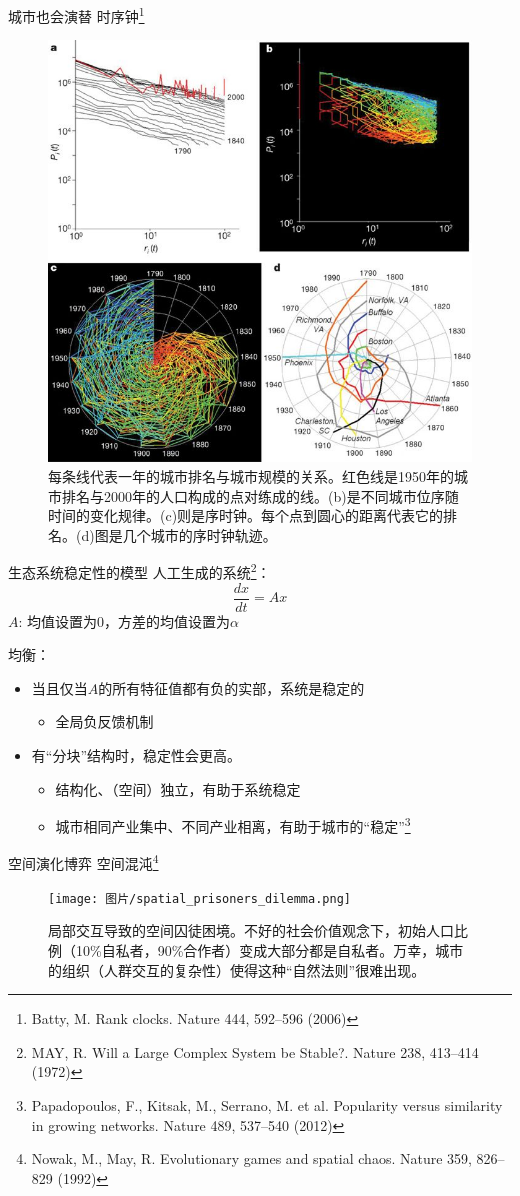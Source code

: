 \documentclass[utf8]{ctexbeamer}
\begin{document}
\begin{frame}{城市也会演替}
    时序钟\footnote{Batty, M. Rank clocks. Nature 444, 592–596 (2006)}
    \begin{figure}
        \centering
        \includegraphics[width = 0.4\linewidth]{图片/rankclocks.jpg}
        \caption{每条线代表一年的城市排名与城市规模的关系。红色线是1950年的城市排名与2000年的人口构成的点对练成的线。(b)是不同城市位序随时间的变化规律。(c)则是序时钟。每个点到圆心的距离代表它的排名。(d)图是几个城市的序时钟轨迹。}
    \end{figure}
\end{frame}

\begin{frame}{生态系统稳定性的模型}
    人工生成的系统\footnote{MAY, R. Will a Large Complex System be Stable?. Nature 238, 413–414 (1972)}：\[\frac{dx}{dt} = Ax\]
    $A$: 均值设置为\(0\)，方差的均值设置为\(\alpha\)

    均衡：
    \begin{itemize}
        \item 当且仅当\(A\)的所有特征值都有负的实部，系统是稳定的
        \begin{itemize}
            \item 全局负反馈机制
        \end{itemize}
        \item 有“分块”结构时，稳定性会更高。
        \begin{itemize}
            \item 结构化、（空间）独立，有助于系统稳定
            \item 城市相同产业集中、不同产业相离，有助于城市的“稳定”\footnote{Papadopoulos, F., Kitsak, M., Serrano, M. et al. Popularity versus similarity in growing networks. Nature 489, 537–540 (2012)}
        \end{itemize}
    \end{itemize}
\end{frame}

\begin{frame}{空间演化博弈}
    空间混沌\footnote{Nowak, M., May, R. Evolutionary games and spatial chaos. Nature 359, 826–829 (1992)}
    \begin{figure}
        \centering
        \texttt{[image: 图片/spatial\_prisoners\_dilemma.png]}
        \caption{局部交互导致的空间囚徒困境。不好的社会价值观念下，初始人口比例（10\%自私者，90\%合作者）变成大部分都是自私者。万幸，城市的组织（人群交互的复杂性）使得这种“自然法则”很难出现。}
    \end{figure}
\end{frame}
\end{document}
